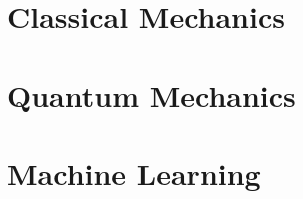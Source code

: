 \documentclass{book}
\begin{document}
\chapter{Classical Mechanics}





\chapter{Quantum Mechanics}


\chapter{Machine Learning}


\end{document}
